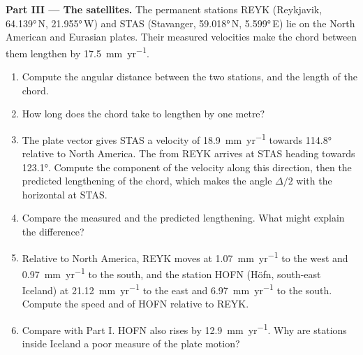 \begin{problem}
\noindent\textbf{Part III --- The satellites.}
The permanent stations REYK (Reykjavik, \ang{64.139}\,N, \ang{21.955}\,W) and
STAS (Stavanger, \ang{59.018}\,N, \ang{5.599}\,E) lie on the North American and
Eurasian plates. Their measured velocities make the chord between them lengthen
by \qty{17.5}{mm.yr^{-1}}.
\begin{enumerate}[resume]
  \item Compute the angular distance between the two stations, and the length
        of the chord.
  \item How long does the chord take to lengthen by one metre?
  \item The plate vector gives STAS a velocity of \qty{18.9}{mm.yr^{-1}} towards
        \ang{114.8} relative to North America. The  from REYK
        arrives at STAS heading towards \ang{123.1}. Compute the component of
        the velocity along this direction, then the predicted lengthening of
        the chord, which makes the angle $\Delta/2$ with the horizontal at STAS.
  \item Compare the measured and the predicted lengthening. What might explain
        the difference?
  \item Relative to North America, REYK moves at \qty{1.07}{mm.yr^{-1}} to the
        west and \qty{0.97}{mm.yr^{-1}} to the south, and the station HOFN (Höfn,
        south-east Iceland) at \qty{21.12}{mm.yr^{-1}} to the east and
        \qty{6.97}{mm.yr^{-1}} to the south. Compute the speed and  of HOFN
        relative to REYK.
  \item Compare with Part I. HOFN also rises by \qty{12.9}{mm.yr^{-1}}. Why are
        stations inside Iceland a poor measure of the plate motion?
\end{enumerate}


\end{problem}
